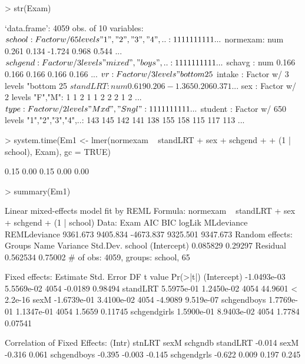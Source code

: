 \documentclass[12pt]{article}
\begin{document}
\begin{Schunk}
\begin{Sinput}
> str(Exam)
\end{Sinput}
\begin{Soutput}
`data.frame':	4059 obs. of  10 variables:
 $ school  : Factor w/ 65 levels "1","2","3","4",..: 1 1 1 1 1 1 1 1 1 1 ...
 $ normexam: num   0.261  0.134 -1.724  0.968  0.544 ...
 $ schgend : Factor w/ 3 levels "mixed","boys",..: 1 1 1 1 1 1 1 1 1 1 ...
 $ schavg  : num  0.166 0.166 0.166 0.166 0.166 ...
 $ vr      : Factor w/ 3 levels "bottom 25%","mid 50%",..: 2 2 2 2 2 2 2 2 2 2 ...
 $ intake  : Factor w/ 3 levels "bottom 25%","mid 50%",..: 1 2 3 2 2 1 3 2 2 3 ...
 $ standLRT: num   0.619  0.206 -1.365  0.206  0.371 ...
 $ sex     : Factor w/ 2 levels "F","M": 1 1 2 1 1 2 2 2 1 2 ...
 $ type    : Factor w/ 2 levels "Mxd","Sngl": 1 1 1 1 1 1 1 1 1 1 ...
 $ student : Factor w/ 650 levels "1","2","3","4",..: 143 145 142 141 138 155 158 115 117 113 ...
\end{Soutput}
\begin{Sinput}
> system.time(Em1 <- lmer(normexam ~ standLRT + sex + schgend + 
+     (1 | school), Exam), gc = TRUE)
\end{Sinput}
\begin{Soutput}
[1] 0.15 0.00 0.15 0.00 0.00
\end{Soutput}
\begin{Sinput}
> summary(Em1)
\end{Sinput}
\begin{Soutput}
Linear mixed-effects model fit by REML
Formula: normexam ~ standLRT + sex + schgend + (1 | school) 
   Data: Exam 
      AIC      BIC    logLik MLdeviance REMLdeviance
 9361.673 9405.834 -4673.837   9325.501     9347.673
Random effects:
 Groups   Name        Variance Std.Dev.
 school   (Intercept) 0.085829 0.29297 
 Residual             0.562534 0.75002 
# of obs: 4059, groups: school, 65

Fixed effects:
                Estimate  Std. Error   DF t value  Pr(>|t|)
(Intercept)  -1.0493e-03  5.5569e-02 4054 -0.0189   0.98494
standLRT      5.5975e-01  1.2450e-02 4054 44.9601 < 2.2e-16
sexM         -1.6739e-01  3.4100e-02 4054 -4.9089 9.519e-07
schgendboys   1.7769e-01  1.1347e-01 4054  1.5659   0.11745
schgendgirls  1.5900e-01  8.9403e-02 4054  1.7784   0.07541

Correlation of Fixed Effects:
            (Intr) stnLRT sexM   schgndb
standLRT    -0.014                      
sexM        -0.316  0.061               
schgendboys -0.395 -0.003 -0.145        
schgendgrls -0.622  0.009  0.197  0.245 
\end{Soutput}
\end{Schunk}
\end{document}
